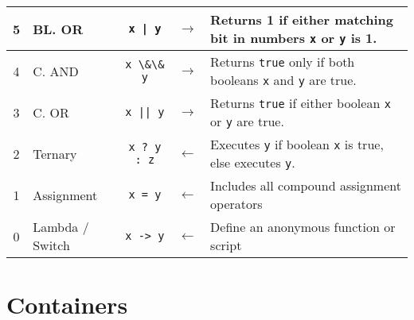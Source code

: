 \documentclass{article}
\begin{document}
\begin{center}
\begin{tabularx}{\textwidth}{clccX}
                  5   & BL. OR            & \lstinline+x | y+     & \(\to\) & Returns 1 if either matching bit in numbers \lstinline|x| or \lstinline|y| is 1.\\\midrule
                  4   & C. AND            & \lstinline|x \&\& y|  & \(\to\) & Returns \lstinline|true| only if both booleans \lstinline|x| and \lstinline|y| are true.\\\midrule
                  3   & C. OR             & \lstinline+x || y+    & \(\to\) & Returns \lstinline|true| if either boolean \lstinline|x| or \lstinline|y| are true.\\\midrule
                  2   & Ternary           & \lstinline|x ? y : z| & \(\gets\) & Executes \lstinline|y| if boolean \lstinline|x| is true, else executes \lstinline|y|.\\\midrule
                  1   & Assignment        & \lstinline!x = y!     & \(\gets\) & Includes all compound assignment operators \\\midrule
                  0   & Lambda / Switch   & \lstinline|x -> y|    & \(\gets\) & Define an anonymous function or script\\\bottomrule
\end{tabularx}\end{center}

\section{Containers}
\end{document}
